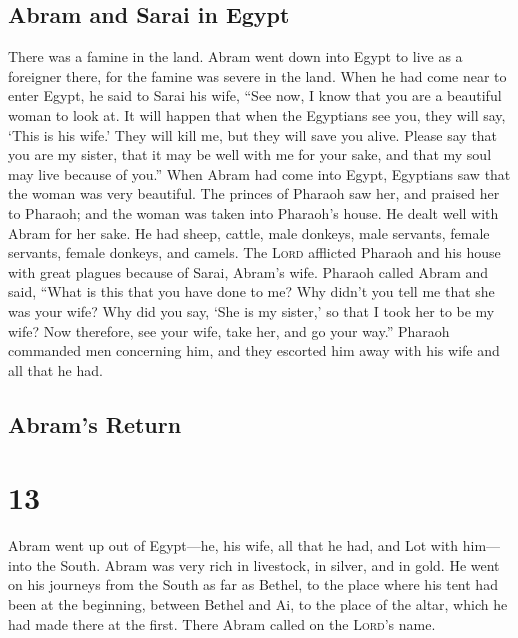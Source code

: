 \hypertarget{abram-and-sarai-in-egypt}{%
\subsection{Abram and Sarai in Egypt}\label{abram-and-sarai-in-egypt}}

 There was a famine in the land. Abram went down into
Egypt to live as a foreigner there, for the famine was severe in the
land.  When he had come near to enter Egypt, he said to
Sarai his wife, ``See now, I know that you are a beautiful woman to look
at.  It will happen that when the Egyptians see you, they
will say, `This is his wife.' They will kill me, but they will save you
alive.  Please say that you are my sister, that it may be
well with me for your sake, and that my soul may live because of you.''
 When Abram had come into Egypt, Egyptians saw that the
woman was very beautiful.  The princes of Pharaoh saw
her, and praised her to Pharaoh; and the woman was taken into Pharaoh's
house.  He dealt well with Abram for her sake. He had
sheep, cattle, male donkeys, male servants, female servants, female
donkeys, and camels.  The \textsc{Lord} afflicted Pharaoh
and his house with great plagues because of Sarai, Abram's wife.
 Pharaoh called Abram and said, ``What is this that you
have done to me? Why didn't you tell me that she was your wife?
 Why did you say, `She is my sister,' so that I took her
to be my wife? Now therefore, see your wife, take her, and go your
way.''  Pharaoh commanded men concerning him, and they
escorted him away with his wife and all that he had.

\hypertarget{abrams-return}{%
\subsection{Abram's Return}\label{abrams-return}}

\hypertarget{section-12}{%
\section{13}\label{section-12}}

 Abram went up out of Egypt---he, his wife, all that he
had, and Lot with him---into the South.  Abram was very
rich in livestock, in silver, and in gold.  He went on his
journeys from the South as far as Bethel, to the place where his tent
had been at the beginning, between Bethel and Ai,  to the
place of the altar, which he had made there at the first. There Abram
called on the \textsc{Lord}'s name.

